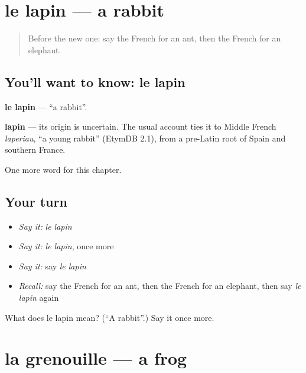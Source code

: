 \section[le lapin]{le lapin — a rabbit}

\label{lesson:FR-C88-lapin}



\begin{quote}
Before the new one: say the French for an ant, then the French for an elephant.
\end{quote}

\subsection*{You'll want to know: le lapin}
\textbf{le lapin} — \textquotedblleft{}a rabbit\textquotedblright{}.

\begin{cousinweb}
\textbf{lapin} — its origin is uncertain. The usual account ties it to Middle French \emph{laperiau}, \textquotedblleft{}a young rabbit\textquotedblright{} (EtymDB 2.1), from a pre-Latin root of Spain and southern France.
\end{cousinweb}

\begin{grammarlens}[title={What you've built}]
One more word for this chapter.
\end{grammarlens}

\subsection*{Your turn}
\begin{itemize}
\raggedright
  \item \emph{Say it:} \emph{le lapin}
  \item \emph{Say it:} \emph{le lapin}, once more
  \item \emph{Say it:} say \emph{le lapin}
  \item \emph{Recall:} say the French for an ant, then the French for an elephant, then say \emph{le lapin} again
\end{itemize}

\begin{tcolorbox}[breakable,colback=teal!4,colframe=teal!35!black,title={Before you move on}]
What does le lapin mean? (\textquotedblleft{}A rabbit\textquotedblright{}.) Say it once more.
\end{tcolorbox}
\section[la grenouille]{la grenouille — a frog}

